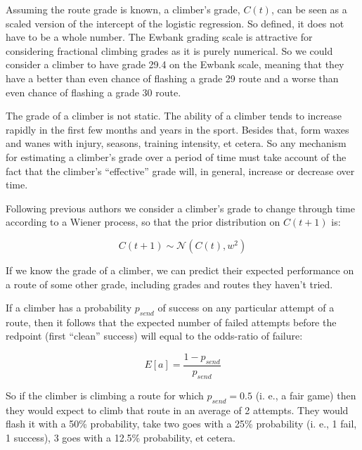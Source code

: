\documentclass{article}
\begin{document}
Assuming the route grade is known, a climber's grade, $C(t)$, can be seen as a scaled version of the intercept of the logistic regression. So defined, it does not have to be a whole number. The Ewbank grading scale is attractive for considering fractional climbing grades as it is purely numerical. So we could consider a climber to have grade 29.4 on the Ewbank scale, meaning that they have a better than even chance of flashing a grade 29 route and a worse than even chance of flashing a grade 30 route.

The grade of a climber is not static. The ability of a climber tends to increase rapidly in the first few months and years in the sport. Besides that, form waxes and wanes with injury, seasons, training intensity, et cetera. So any mechanism for estimating a climber's grade over a period of time must take account of the fact that the climber's ``effective'' grade will, in general, increase or decrease over time.

Following previous authors  \cite{coulom2008whole,scarff2020estimation} we consider a climber's grade to change through time according to a Wiener process, so that the prior distribution on $C(t+1)$ is:

\begin{equation}
C(t+1) \sim \mathcal{N}(C(t), w^2)  
\end{equation}

If we know the grade of a climber, we can predict their expected performance on a route of some other grade, including grades and routes they haven't tried. 


If a climber has a probability $p_{send}$ of success on any particular attempt of a route, then it follows that the expected number of failed attempts before the redpoint (first ``clean'' success) will equal to the odds-ratio of failure:

\begin{equation}
 E\left[a\right]=\frac{1-p_{send}}{p_{send}}
 \end{equation} 
 
 So if the climber is climbing a route for which $p_{send}=0.5$ (i. e., a fair game) then they would expect to climb that route in an average of 2 attempts. They would flash it with a 50\% probability, take two goes with a 25\% probability (i. e., 1 fail, 1 success), 3 goes with a 12.5\% probability, et cetera.
\end{document}
